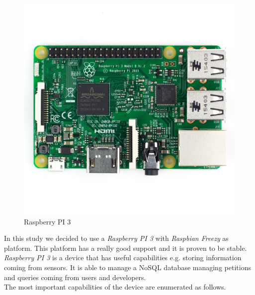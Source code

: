 \begin{figure}[H]
\begin{centering}
\includegraphics[scale=0.3]{IMGS/RPI_3.JPG}
\caption{Raspberry PI 3 \label{RPI_3}}
\end{centering}
\end{figure}

In this study we decided to use a \textit{Raspberry PI 3} with \textit{Raspbian Freezy} as platform. This platform has a really good support and it is proven to be stable.\\

\textit{Raspberry PI 3} is a device that has useful capabilities e.g. storing information coming from sensors. It is able to manage a NoSQL database managing petitions and queries coming from users and developers.\\

The most important capabilities of the device are enumerated as follows.

